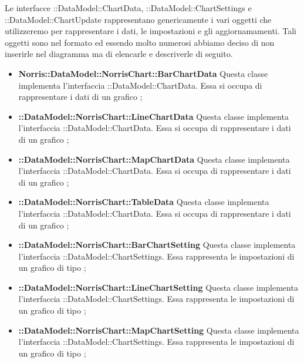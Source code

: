 	Le interfacce ::DataModel::ChartData, ::DataModel::ChartSettings e ::DataModel::ChartUpdate rappresentano genericamente i vari oggetti che utilizzeremo per rappresentare i dati, le impostazioni e gli aggiornamamenti. Tali oggetti sono nel formato  ed essendo molto numerosi abbiamo deciso di non inserirle nel diagramma ma di elencarle e descriverle di seguito.

	\begin{itemize}
		\item \textbf{Norris::DataModel::NorrisChart::BarChartData} Questa classe implementa l'interfaccia ::DataModel::ChartData. Essa si occupa di rappresentare i dati di un grafico ;

		\item \textbf{::DataModel::NorrisChart::LineChartData} Questa classe implementa l'interfaccia ::DataModel::ChartData. Essa si occupa di rappresentare i dati di un grafico ;

		\item \textbf{::DataModel::NorrisChart::MapChartData} Questa classe implementa l'interfaccia ::DataModel::ChartData. Essa si occupa di rappresentare i dati di un grafico ;

		\item \textbf{::DataModel::NorrisChart::TableData} Questa classe implementa l'interfaccia \linebreak {}::DataModel::ChartData. Essa si occupa di rappresentare i dati di un grafico ;

		\item \textbf{::DataModel::NorrisChart::BarChartSetting} Questa classe implementa l'interfaccia ::DataModel::ChartSettings. Essa rappresenta le impostazioni di un grafico di tipo ;

		\item \textbf{::DataModel::NorrisChart::LineChartSetting} Questa classe implementa l'interfaccia ::DataModel::ChartSettings. Essa rappresenta le impostazioni di un grafico di tipo ;

		\item \textbf{::DataModel::NorrisChart::MapChartSetting} Questa classe implementa l'interfaccia ::DataModel::ChartSettings. Essa rappresenta le impostazioni di un grafico di tipo ;


\end{itemize}
